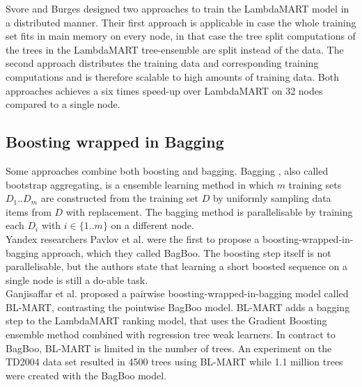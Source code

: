 Svore and Burges \cite{Svore2010,Svore2012} designed two approaches to train the \mbox{LambdaMART} \cite{Wu2008} model in a distributed manner. Their first approach is applicable in case the whole training set fits in main memory on every node, in that case the tree split computations of the trees in the LambdaMART tree-ensemble are split instead of the data. The second approach distributes the training data and corresponding training computations and is therefore scalable to high amounts of training data. Both approaches achieves a six times speed-up over LambdaMART on 32 nodes compared to a single node.

\subsection{Boosting wrapped in Bagging}
Some approaches combine both boosting and bagging. Bagging \cite{Breiman1996}, also called bootstrap aggregating, is a ensemble learning method in which $m$ training sets $D_1..D_m$ are constructed from the training set $D$ by uniformly sampling data items from $D$ with replacement. The bagging method is parallelisable by training each $D_i$ with $i \in \{1..m\}$ on a different node.\\

Yandex researchers Pavlov et al. \cite{Pavlov2010} were the first to propose a boosting-wrapped-in-bagging approach, which they called BagBoo. The boosting step itself is not parallelisable, but the authors state that learning a short boosted sequence on a single node is still a do-able task.\\

Ganjisaffar et al. \cite{Ganjisaffar2011c, Ganjisaffar2011b} proposed a pairwise boosting-wrapped-in-bagging model called BL-MART, contrasting the pointwise BagBoo model. BL-MART adds a bagging step to the LambdaMART \cite{Wu2008} ranking model, that uses the Gradient Boosting \cite{Friedman2002} ensemble method combined with regression tree weak learners. In contract to BagBoo, BL-MART is limited in the number of trees. An experiment on the TD2004 data set resulted in 4500 trees using BL-MART while 1.1 million trees were created with the BagBoo model.

